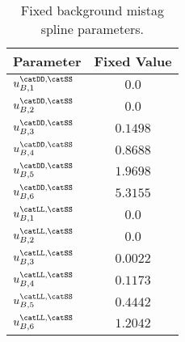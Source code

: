 %
\begin{table}[htb]
\caption{Fixed background \SSpi mistag spline parameters.}
\label{tab:app:measurement_of_sin2beta:cpv_measurement:fixed_parameters:eta:bkg:ss}
\centering
\begin{tabular}{lr@{$\,\pm\,$}l}
  \toprule
  Parameter                     & \multicolumn{2}{c}{Fixed Value} \\
  \midrule
  $u_{B,1}^\text{\catDD,\catSS}$ & \multicolumn{2}{c}{$0.0$}\\
  $u_{B,2}^\text{\catDD,\catSS}$ & \multicolumn{2}{c}{$0.0$}\\
  $u_{B,3}^\text{\catDD,\catSS}$ & \multicolumn{2}{c}{$0.1498$}\\
  $u_{B,4}^\text{\catDD,\catSS}$ & \multicolumn{2}{c}{$0.8688$}\\
  $u_{B,5}^\text{\catDD,\catSS}$ & \multicolumn{2}{c}{$1.9698$}\\
  $u_{B,6}^\text{\catDD,\catSS}$ & \multicolumn{2}{c}{$5.3155$}\\
  $u_{B,1}^\text{\catLL,\catSS}$ & \multicolumn{2}{c}{$0.0$}\\
  $u_{B,2}^\text{\catLL,\catSS}$ & \multicolumn{2}{c}{$0.0$}\\
  $u_{B,3}^\text{\catLL,\catSS}$ & \multicolumn{2}{c}{$0.0022$}\\
  $u_{B,4}^\text{\catLL,\catSS}$ & \multicolumn{2}{c}{$0.1173$}\\
  $u_{B,5}^\text{\catLL,\catSS}$ & \multicolumn{2}{c}{$0.4442$}\\
  $u_{B,6}^\text{\catLL,\catSS}$ & \multicolumn{2}{c}{$1.2042$}\\
  \bottomrule
\end{tabular}
\end{table}
%
